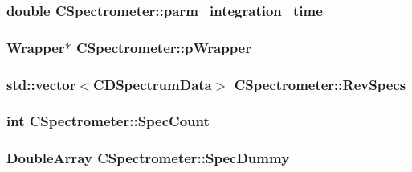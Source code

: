 \label{classCSpectrometer_a896f74cc1936017bb5189d43d8c27f6f}
\hypertarget{classCSpectrometer_a2b113a0eb67d6581327fa4193c3af699}{
\subsubsection[{parm\_\-integration\_\-time}]{\setlength{\rightskip}{0pt plus 5cm}double {\bf CSpectrometer::parm\_\-integration\_\-time}}}
\label{classCSpectrometer_a2b113a0eb67d6581327fa4193c3af699}
\hypertarget{classCSpectrometer_a54e4c92187f303ebb76ca6f8717ca644}{
\subsubsection[{pWrapper}]{\setlength{\rightskip}{0pt plus 5cm}Wrapper$\ast$ {\bf CSpectrometer::pWrapper}}}
\label{classCSpectrometer_a54e4c92187f303ebb76ca6f8717ca644}
\hypertarget{classCSpectrometer_a75d6df9d683281a8390c425c3530e2a6}{
\subsubsection[{RevSpecs}]{\setlength{\rightskip}{0pt plus 5cm}std::vector$<${\bf CDSpectrumData}$>$ {\bf CSpectrometer::RevSpecs}}}
\label{classCSpectrometer_a75d6df9d683281a8390c425c3530e2a6}
\hypertarget{classCSpectrometer_a681feb9200933a1a6a16002275442dfc}{
\subsubsection[{SpecCount}]{\setlength{\rightskip}{0pt plus 5cm}int {\bf CSpectrometer::SpecCount}}}
\label{classCSpectrometer_a681feb9200933a1a6a16002275442dfc}
\hypertarget{classCSpectrometer_ac04b2fce0185a9c84cb6f636e36a4f8b}{
\subsubsection[{SpecDummy}]{\setlength{\rightskip}{0pt plus 5cm}DoubleArray {\bf CSpectrometer::SpecDummy}}}
